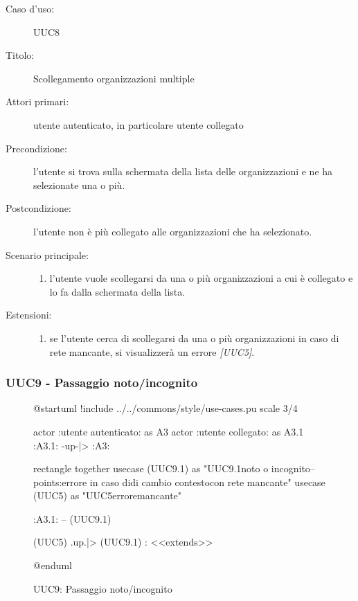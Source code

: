\documentclass[casi-duso]{subfiles}
\begin{document}
\begin{description}
  \item[Caso d’uso:] UUC8
  \item[Titolo:] Scollegamento organizzazioni multiple
  \item[Attori primari:] utente autenticato, in particolare utente collegato
  \item[Precondizione:] l'utente si trova sulla schermata della lista delle organizzazioni e ne ha selezionate una o più.
  \item[Postcondizione:] l'utente non è più collegato alle organizzazioni che ha selezionato.
  \item[Scenario principale:]
        \begin{enumerate}
          \item l'utente vuole scollegarsi da una o più organizzazioni a cui è collegato e lo fa dalla schermata della lista.
        \end{enumerate}
  \item[Estensioni:]
        \begin{enumerate}
          \item se l'utente cerca di scollegarsi da una o più organizzazioni in caso di rete mancante, si visualizzerà un errore \emph{[UUC5]}.
        \end{enumerate}
\end{description}

\subsubsection{UUC9 - Passaggio noto/incognito}%
\label{subsub:UUC9utente}

\begin{figure}[h!]
  \centering
  \begin{plantuml}
  @startuml
  !include ../../commons/style/use-cases.pu
  scale 3/4

  actor :utente autenticato: as A3
  actor :utente collegato: as A3.1
  :A3.1: -up-|> :A3:

  rectangle {
    together {
      usecase (UUC9.1) as "UUC9.1\nScelta noto o incognito\n--\nExtension points:\nVisualizzazione errore in caso di\noperazione di cambio contesto\n con rete mancante"
      usecase (UUC5) as "UUC5\nVisualizzazione errore\nrete mancante"
    }
  }

  :A3.1: -- (UUC9.1)

  (UUC5) .up.|> (UUC9.1) : <<extends>>

  @enduml
  \end{plantuml}
  \caption{UUC9: Passaggio noto/incognito}
  \label{fig:uuc9}
\end{figure}
\end{document}

